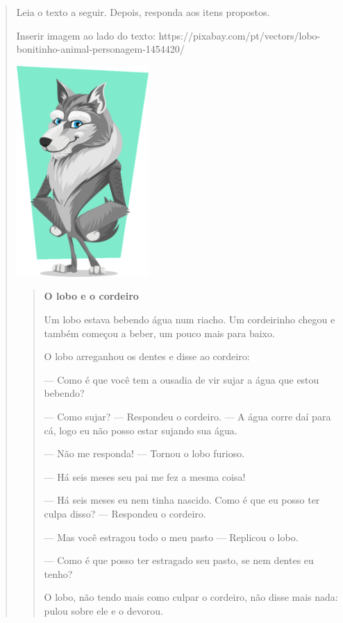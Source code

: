 \begin{quote}
\begin{iteize}
Leia o texto a seguir. Depois, responda aos itens propostos.

Inserir imagem ao lado do texto:
https://pixabay.com/pt/vectors/lobo-bonitinho-animal-personagem-1454420/

\includegraphics[width=1.97917in,height=3.16667in]{media/image5.png}

\begin{quote}
\textbf{O lobo e o cordeiro}

Um lobo estava bebendo água num riacho. Um cordeirinho chegou e também
começou a beber, um pouco mais para baixo.

O lobo arreganhou os dentes e disse ao cordeiro:

--- Como é que você tem a ousadia de vir sujar a água que estou bebendo?

--- Como sujar? --- Respondeu o cordeiro. --- A água corre daí para cá,
logo eu não posso estar sujando sua água.

--- Não me responda! --- Tornou o lobo furioso.

--- Há seis meses seu pai me fez a mesma coisa!

--- Há seis meses eu nem tinha nascido. Como é que eu posso ter culpa
disso? --- Respondeu o cordeiro.

--- Mas você estragou todo o meu pasto --- Replicou o lobo.

--- Como é que posso ter estragado seu pasto, se nem dentes eu tenho?

O lobo, não tendo mais como culpar o cordeiro, não disse mais nada:
pulou sobre ele e o devorou.

\end{quote}


\end{iteize}
\end{quote}
